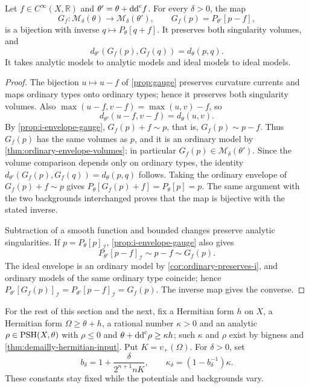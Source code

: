 \begin{proposition}\label{prop:model-comparison-gauge}
Let $f\in C^\infty(X,\mathbb R)$ and $\theta'=\theta+\mathrm{dd}^{\mathrm{c}} f$. For every $\delta>0$, the map
\[
 G_f\colon\mathcal M_\delta(\theta)\longrightarrow\mathcal M_\delta(\theta'),
 \qquad G_f(p)=P_{\theta'}[p-f],
\]
is a bijection with inverse $q\mapsto P_\theta[q+f]$. It preserves both singularity volumes, and
\[
 d_{\theta'}(G_f(p),G_f(q))=d_\theta(p,q).
\]
It takes analytic models to analytic models and ideal models to ideal models.
\end{proposition}
\begin{proof}
The bijection $u\mapsto u-f$ of \cref{prop:gauge} preserves curvature currents and maps ordinary types onto ordinary types; hence it preserves both singularity volumes. Also $\max(u-f,v-f)=\max(u,v)-f$, so
\[
 d_{\theta'}(u-f,v-f)=d_\theta(u,v).
\]
By \cref{prop:i-envelope-gauge}, $G_f(p)+f\sim p$, that is, $G_f(p)\sim p-f$. Thus $G_f(p)$ has the same volumes as $p$, and it is an ordinary model by \cref{thm:ordinary-envelope-volumes}; in particular $G_f(p)\in\mathcal M_\delta(\theta')$. Since the volume comparison depends only on ordinary types, the identity $d_{\theta'}(G_f(p),G_f(q))=d_\theta(p,q)$ follows. Taking the ordinary envelope of $G_f(p)+f\sim p$ gives $P_\theta[G_f(p)+f]=P_\theta[p]=p$. The same argument with the two backgrounds interchanged proves that the map is bijective with the stated inverse.

Subtraction of a smooth function and bounded changes preserve analytic singularities. If $p=P_\theta[p]_{\mathcal I}$, \cref{prop:i-envelope-gauge} also gives
\[
 P_{\theta'}[p-f]_{\mathcal I}\sim p-f\sim G_f(p).
\]
The ideal envelope is an ordinary model by \cref{cor:ordinary-preserves-i}, and ordinary models of the same ordinary type coincide; hence $P_{\theta'}[G_f(p)]_{\mathcal I}=P_{\theta'}[p-f]_{\mathcal I}=G_f(p)$. The inverse map gives the converse.
\end{proof}

For the rest of this section and the next, fix a Hermitian form $h$ on $X$, a Hermitian form $\Omega\geq\theta+h$, a rational number $\kappa>0$ and an analytic $\rho\in\mathrm{PSH}(X,\theta)$ with $\rho\leq0$ and $\theta+\mathrm{dd}^{\mathrm{c}}\rho\geq\kappa h$; such $\kappa$ and $\rho$ exist by bigness and \cref{thm:demailly-hermitian-input}. Put $K=v_+(\Omega)$. For $\delta>0$, set
\[
 b_\delta=1+\frac{\delta}{2^{n+1}nK},\qquad
 \kappa_\delta=(1-b_\delta^{-1})\kappa.
\]
These constants stay fixed while the potentials and backgrounds vary.

